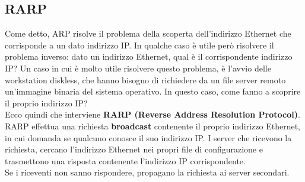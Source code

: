     \subsection{RARP}
        Come detto, ARP risolve il problema della scoperta dell’indirizzo Ethernet che corrisponde a un
        dato indirizzo IP. In qualche caso è utile però risolvere il problema inverso: dato un indirizzo
        Ethernet, qual è il corrispondente indirizzo IP? Un caso in cui è molto utile risolvere questo
        problema, è l’avvio delle workstation diskless, che hanno bisogno di richiedere da un file server
        remoto un’immagine binaria del sistema operativo. In questo caso, come fanno a scoprire il
        proprio indirizzo IP?\\
        
        Ecco quindi che interviene \textbf{RARP (Reverse Address Resolution Protocol)}. RARP effettua una
        richiesta \textbf{broadcast} contenente il proprio indirizzo Ethernet, in cui domanda se qualcuno
        conosce il suo indirizzo IP. I server che ricevono la richiesta, cercano l’indirizzo Ethernet nei
        propri file di configurazione e trasmettono una risposta contenente l’indirizzo IP
        corrispondente.\\

        Se i riceventi non sanno rispondere, propagano la richiesta ai server secondari.
        